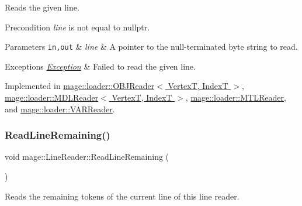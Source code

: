 Reads the given line.

\begin{DoxyPrecond}{Precondition}
{\itshape line} is not equal to {\ttfamily nullptr}. 
\end{DoxyPrecond}

\begin{DoxyParams}[1]{Parameters}
\mbox{\tt in,out}  & {\em line} & A pointer to the null-\/terminated byte string to read. \\
\hline
\end{DoxyParams}

\begin{DoxyExceptions}{Exceptions}
{\em \hyperlink{classmage_1_1_exception}{Exception}} & Failed to read the given line. \\
\hline
\end{DoxyExceptions}


Implemented in \hyperlink{classmage_1_1loader_1_1_o_b_j_reader_a9a66ccf1569bdef5194dae20f6282186}{mage\+::loader\+::\+O\+B\+J\+Reader$<$ Vertex\+T, Index\+T $>$}, \hyperlink{classmage_1_1loader_1_1_m_d_l_reader_ac820f425a40dcd407434fdff4d420f86}{mage\+::loader\+::\+M\+D\+L\+Reader$<$ Vertex\+T, Index\+T $>$}, \hyperlink{classmage_1_1loader_1_1_m_t_l_reader_af16f5fa26bd9649d56550738bae77d24}{mage\+::loader\+::\+M\+T\+L\+Reader}, and \hyperlink{classmage_1_1loader_1_1_v_a_r_reader_a9635d8d256066746be81d9c2d223961d}{mage\+::loader\+::\+V\+A\+R\+Reader}.

\hypertarget{classmage_1_1_line_reader_a3a4b99bfef1e8a826d74a01bcc663fcb}{}\label{classmage_1_1_line_reader_a3a4b99bfef1e8a826d74a01bcc663fcb} 
\subsubsection{\texorpdfstring{Read\+Line\+Remaining()}{ReadLineRemaining()}}
{\footnotesize\ttfamily void mage\+::\+Line\+Reader\+::\+Read\+Line\+Remaining (\begin{DoxyParamCaption}{ }\end{DoxyParamCaption})\hspace{0.3cm}{\ttfamily [protected]}}

Reads the remaining tokens of the current line of this line reader. \hypertarget{classmage_1_1_line_reader_ae9a7547d01b29c3237b198444d4f3aef}{}\label{classmage_1_1_line_reader_ae9a7547d01b29c3237b198444d4f3aef} 
